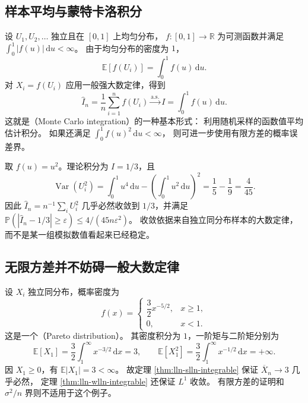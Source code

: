 \documentclass[UTF8]{ctexart}
\begin{document}
\subsection{样本平均与蒙特卡洛积分}

设 $U_1,U_2,\ldots$ 独立且在 $[0,1]$ 上均匀分布，
$f:[0,1]\to\mathbb R$ 为可测函数并满足 $\int_0^1|f(u)|\,\mathrm du<\infty$。
由于均匀分布的密度为 $1$，
\[
  \mathbb E[f(U_i)]=\int_0^1 f(u)\,\mathrm du.
\]
对 $X_i=f(U_i)$ 应用一般强大数定律，得到
\begin{equation}
  \widehat I_n=\frac1n\sum_{i=1}^nf(U_i)
  \xrightarrow{\mathrm{a.s.}}
  I=\int_0^1 f(u)\,\mathrm du.
  \label{eq:lln-monte-carlo}
\end{equation}
这就是（Monte Carlo integration）的一种基本形式：
利用随机采样的函数值平均估计积分。
如果还满足 $\int_0^1f(u)^2\,\mathrm du<\infty$，
则可进一步使用有限方差的概率误差界。

\begin{example}[估计平方函数的积分]
取 $f(u)=u^2$。理论积分为 $I=1/3$，且
\[
  \operatorname{Var}(U_i^2)
  =\int_0^1u^4\,\mathrm du
   -\left(\int_0^1u^2\,\mathrm du\right)^2
  =\frac15-\frac19=\frac4{45}.
\]
因此 $\widehat I_n=n^{-1}\sum_iU_i^2$ 几乎必然收敛到 $1/3$，并满足
$\mathbb P(|\widehat I_n-1/3|\geq\varepsilon)
\leq4/(45n\varepsilon^2)$。
收敛依据来自独立同分布样本的大数定律，而不是某一组模拟数值看起来已经稳定。
\end{example}

\subsection{无限方差并不妨碍一般大数定律}

\begin{example}
\label{ex:lln-infinite-variance}
设 $X_i$ 独立同分布，概率密度为
\[
  f(x)=
  \begin{cases}
    \dfrac32x^{-5/2},&x\geq1,\\
    0,&x<1.
  \end{cases}
\]
这是一个（Pareto distribution）。
其密度积分为 $1$，一阶矩与二阶矩分别为
\[
  \mathbb E[X_1]
  =\frac32\int_1^\infty x^{-3/2}\,\mathrm dx=3,
  \qquad
  \mathbb E[X_1^2]
  =\frac32\int_1^\infty x^{-1/2}\,\mathrm dx=+\infty.
\]
因 $X_1\geq0$，有 $\mathbb E|X_1|=3<\infty$。
故定理 \ref{thm:lln-slln-integrable} 保证 $\overline X_n\to3$ 几乎必然，
定理 \ref{thm:lln-wlln-integrable} 还保证 $L^1$ 收敛。
有限方差的证明和 $\sigma^2/n$ 界则不适用于这个例子。
\end{example}
\end{document}
